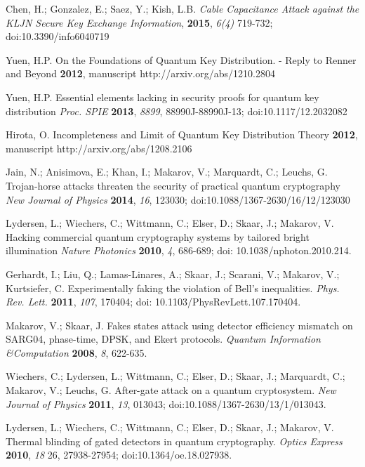 \documentclass{ws-fnl2}
\begin{document}
\begin{thebibliography}{99}
Chen, H.; Gonzalez, E.; Saez, Y.; Kish, L.B. {\em Cable Capacitance Attack against the KLJN Secure Key Exchange} {\em Information}, {\bf 2015}, {\em 6(4)} 719-732; doi:10.3390/info6040719

Yuen, H.P. On the Foundations of Quantum Key Distribution. - Reply to Renner and Beyond {\bf 2012}, manuscript http://arxiv.org/abs/1210.2804

Yuen, H.P. Essential elements lacking in security proofs for quantum key distribution {\em Proc. SPIE} {\bf 2013}, {\em 8899}, 88990J-88990J-13; doi:10.1117/12.2032082

Hirota, O. Incompleteness and Limit of Quantum Key Distribution Theory {\bf 2012}, manuscript http://arxiv.org/abs/1208.2106



Jain, N.; Anisimova, E.; Khan, I.; Makarov, V.; Marquardt, C.; Leuchs, G. Trojan-horse attacks threaten the security of practical quantum cryptography {\em New Journal of Physics} {\bf 2014}, {\em 16}, 123030; doi:10.1088/1367-2630/16/12/123030

Lydersen, L.; Wiechers, C.; Wittmann, C.; Elser, D.; Skaar, J.; Makarov, V. Hacking
commercial quantum cryptography systems by tailored bright illumination {\em Nature Photonics} {\bf 2010}, {\em 4}, 686-689; doi: 10.1038/nphoton.2010.214.

Gerhardt, I.; Liu, Q.; Lamas-Linares, A.; Skaar, J.; Scarani, V.; Makarov, V.; Kurtsiefer, C. Experimentally faking the violation of Bell's inequalities. {\em Phys. Rev. Lett.} {\bf 2011}, {\em 107}, 170404; doi: 10.1103/PhysRevLett.107.170404.

Makarov, V.; Skaar, J. Fakes states attack using detector efficiency mismatch on SARG04, phase-time, DPSK, and Ekert protocols. {\em Quantum Information \&Computation} {\bf 2008}, {\em 8}, 622-635.

Wiechers, C.; Lydersen, L.; Wittmann, C.; Elser, D.; Skaar, J.; Marquardt, C.; Makarov, V.; Leuchs, G. After-gate attack on a quantum cryptosystem. {\em New Journal of Physics} {\bf 2011}, {\em 13}, 013043; doi:10.1088/1367-2630/13/1/013043.

Lydersen, L.; Wiechers, C.; Wittmann, C.; Elser, D.; Skaar, J.; Makarov, V. Thermal blinding of gated detectors in quantum cryptography. {\em Optics Express} {\bf 2010}, {\em 18} 26,  27938-27954; doi:10.1364/oe.18.027938.


\end{thebibliography}
\end{document}

